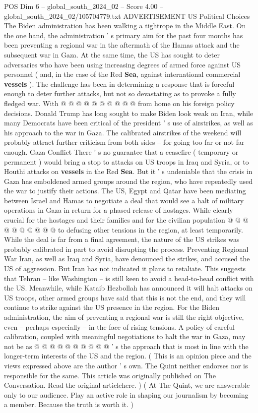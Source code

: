\begin{textsample}{POS Dim 6 – global\_south\_2024\_02 – Score 4.00 – global\_south\_2024\_02/105704779.txt}
ADVERTISEMENT US Political Choices The Biden administration has been walking a tightrope in the Middle East.
On the one hand, the administration ' s primary aim for the past four months has been preventing a regional war in the aftermath of the Hamas attack and the subsequent war in Gaza.
At the same time, the US has sought to deter adversaries who have been using increasing degrees of armed force against US personnel ( and, in the case of the Red \textbf{Sea}, against international commercial \textbf{vessels} ).
The challenge has been in determining a response that is forceful enough to deter further attacks, but not so devastating as to provoke a fully fledged war.
With @ @ @ @ @ @ @ @ @ @ from home on his foreign policy decisions.
Donald Trump has long sought to make Biden look weak on Iran, while many Democrats have been critical of the president ' s use of airstrikes, as well as his approach to the war in Gaza.
The calibrated airstrikes of the weekend will probably attract further criticism from both sides -- for going too far or not far enough.
Gaza Conflict There ' s no guarantee that a ceasefire ( temporary or permanent ) would bring a stop to attacks on US troops in Iraq and Syria, or to Houthi attacks on \textbf{vessels} in the Red \textbf{Sea}.
But it ' s undeniable that the crisis in Gaza has emboldened armed groups around the region, who have repeatedly used the war to justify their actions.
The US, Egypt and Qatar have been mediating between Israel and Hamas to negotiate a deal that would see a halt of military operations in Gaza in return for a phased release of hostages.
While clearly crucial for the hostages and their families and for the civilian population @ @ @ @ @ @ @ @ @ @ to defusing other tensions in the region, at least temporarily.
While the deal is far from a final agreement, the nature of the US strikes was probably calibrated in part to avoid disrupting the process.
Preventing Regional War Iran, as well as Iraq and Syria, have denounced the strikes, and accused the US of aggression.
But Iran has not indicated it plans to retaliate.
This suggests that Tehran -- like Washington -- is still keen to avoid a head-to-head conflict with the US.
Meanwhile, while Kataib Hezbollah has announced it will halt attacks on US troops, other armed groups have said that this is not the end, and they will continue to strike against the US presence in the region.
For the Biden administration, the aim of preventing a regional war is still the right objective, even -- perhaps especially -- in the face of rising tensions.
A policy of careful calibration, coupled with meaningful negotiations to halt the war in Gaza, may not be as @ @ @ @ @ @ @ @ @ @ ' s the approach that is most in line with the longer-term interests of the US and the region. ( This is an opinion piece and the views expressed above are the author ' s own.
The Quint neither endorses nor is responsible for the same.
This article was originally published on The Conversation.
Read the original articlehere. ) ( At The Quint, we are answerable only to our audience.
Play an active role in shaping our journalism by becoming a member.
Because the truth is worth it. )

\end{textsample}
